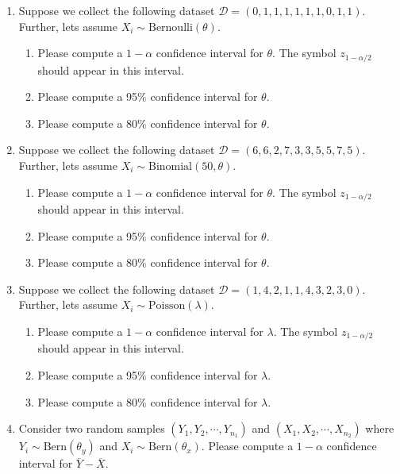 \begin{enumerate}
    \item Suppose we collect the following dataset $\mathcal{D} = (0, 1, 1, 1, 1, 1, 1, 0, 1, 1)$. Further, lets assume $X_{i} \sim \text{Bernoulli}(\theta)$.
        \begin{enumerate}
            \item Please compute a $1-\alpha$ confidence interval for $\theta$. The symbol $z_{1-\alpha/2}$ should appear in this interval. 
            \item Please compute a 95\% confidence interval for $\theta$.
            \item Please compute a 80\% confidence interval for $\theta$.
        \end{enumerate}
        
    \item Suppose we collect the following dataset $\mathcal{D} = (6, 6, 2, 7, 3, 3, 5, 5, 7, 5)$. Further, lets assume $X_{i} \sim \text{Binomial}(50,\theta)$.
        \begin{enumerate}
            \item Please compute a $1-\alpha$ confidence interval for $\theta$. The symbol $z_{1-\alpha/2}$ should appear in this interval. 
            \item Please compute a 95\% confidence interval for $\theta$.
            \item Please compute a 80\% confidence interval for $\theta$.
        \end{enumerate}
        

    \item Suppose we collect the following dataset $\mathcal{D} = (1, 4, 2, 1, 1, 4, 3, 2, 3, 0)$. Further, lets assume $X_{i} \sim \text{Poisson}(\lambda)$.
        \begin{enumerate}
            \item Please compute a $1-\alpha$ confidence interval for $\lambda$. The symbol $z_{1-\alpha/2}$ should appear in this interval. 
            \item Please compute a 95\% confidence interval for $\lambda$.
            \item Please compute a 80\% confidence interval for $\lambda$.
        \end{enumerate}
    
    \item Consider two random samples $(Y_{1},Y_{2},\cdots,Y_{n_{1}})$ and $(X_{1},X_{2},\cdots,X_{n_{2}})$ where $Y_{i} \sim \text{Bern}(\theta_{y})$ and $X_{i} \sim \text{Bern}(\theta_{x})$. Please compute a $1-\alpha$ confidence interval for $\overline{Y} - \overline{X}$. 
    

\end{enumerate}
